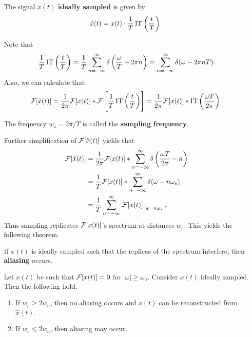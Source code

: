\documentclass{memoir}
\begin{document}
\begin{definition}
    The signal $x(t)$ \textbf{ideally sampled} is given by
    \begin{align*}
        \tilde{x}(t) = x(t) \cdot \frac{1}{T}\operatorname{IT}\left(\frac{t}{T}\right).
    \end{align*}
\end{definition}
Note that
\begin{align*}
    \frac{1}{T}\operatorname{IT}\left(\frac{t}{T}\right) = \frac{1}{T} \sum_{n=-\infty}^{\infty}\delta\left(\frac{\omega}{T} - 2 \pi n\right) = \sum_{n=-\infty}^{\infty} \delta(\omega - 2 \pi n T).
\end{align*}
Also, we can calculate that
\begin{align*}
    \mathcal{F}[\tilde{x}(t)] = \frac{1}{2 \pi} \mathcal{F}[x(t)] \ast \mathcal{F}\left[\frac{1}{T}\operatorname{IT}\left(\frac{t}{T}\right)\right] = \frac{1}{2 \pi} \mathcal{F}[x(t)] \ast \operatorname{IT}\left(\frac{\omega T}{2 \pi}\right).
\end{align*}
\begin{definition}
    The frequency $w_s = 2 \pi / T$ is called the \textbf{sampling frequency}.
\end{definition}
Further simplification of $\mathcal{F}[\tilde{x}(t)]$ yields that
\begin{align*}
    \mathcal{F}[\tilde{x}(t)] &= \frac{1}{2 \pi} \mathcal{F}[x(t)] \ast \sum_{n=-\infty}^{\infty} \delta\left(\frac{\omega T}{2\pi} - n\right) \\
    &= \frac{1}{T} \mathcal{F}[x(t)] \ast \sum_{n=-\infty}^{\infty} \delta( \omega - n \omega_s) \\
    &= \frac{1}{T} \sum_{n=-\infty}^{\infty} \left.\mathcal{F}[x(t)]\right|_{w=n \omega_s}.
\end{align*}
Thus sampling replicates $\mathcal{F}[x(t)]$'s spectrum at distances $w_s$. This yields the following theorem.
\begin{definition}
    If $x(t)$ is ideally sampled such that the replicas of the spectrum interfere, then \textbf{aliasing} occurs.
\end{definition}
\begin{theorem}
    Let $x(t)$ be such that $\mathcal{F}[x(t)] = 0$ for $|\omega| \ge \omega_a$. Consider $x(t)$ ideally sampled. Then the following hold.
    \begin{enumerate}
        \item If $w_s \ge 2 w_a$, then no aliasing occurs and $x(t)$ can be reconstructed from $\hat{x}(t)$.
        \item If $w_s \le 2 w_a$, then aliasing may occur.
    \end{enumerate}
\end{theorem}
\end{document}
